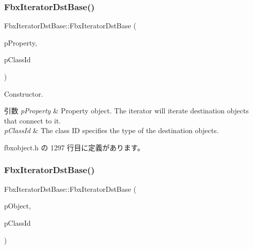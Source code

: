 \subsubsection{\texorpdfstring{Fbx\+Iterator\+Dst\+Base()}{FbxIteratorDstBase()}\hspace{0.1cm}{\footnotesize\ttfamily [1/2]}}
{\footnotesize\ttfamily Fbx\+Iterator\+Dst\+Base\+::\+Fbx\+Iterator\+Dst\+Base (\begin{DoxyParamCaption}\item[{\hyperlink{class_fbx_property}{Fbx\+Property} \&}]{p\+Property,  }\item[{\hyperlink{class_fbx_class_id}{Fbx\+Class\+Id}}]{p\+Class\+Id }\end{DoxyParamCaption})\hspace{0.3cm}{\ttfamily [inline]}}

Constructor. 
\begin{DoxyParams}{引数}
{\em p\+Property} & Property object. The iterator will iterate destination objects that connect to it. \\
\hline
{\em p\+Class\+Id} & The class ID specifies the type of the destination objects. \\
\hline
\end{DoxyParams}


 fbxobject.\+h の 1297 行目に定義があります。

\mbox{\label{class_fbx_iterator_dst_base_a28644eed9f037cf94d81dbf7c733622e}} 
\subsubsection{\texorpdfstring{Fbx\+Iterator\+Dst\+Base()}{FbxIteratorDstBase()}\hspace{0.1cm}{\footnotesize\ttfamily [2/2]}}
{\footnotesize\ttfamily Fbx\+Iterator\+Dst\+Base\+::\+Fbx\+Iterator\+Dst\+Base (\begin{DoxyParamCaption}\item[{\hyperlink{class_fbx_object}{Fbx\+Object} $\ast$}]{p\+Object,  }\item[{\hyperlink{class_fbx_class_id}{Fbx\+Class\+Id}}]{p\+Class\+Id }\end{DoxyParamCaption})\hspace{0.3cm}{\ttfamily [inline]}}

